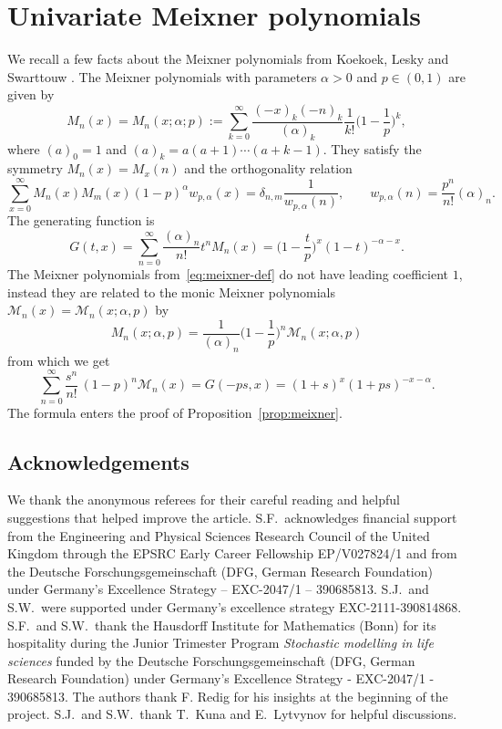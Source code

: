 \documentclass[pdftex]{sigma}
\numberwithin{equation}{section}
\newcommand{\1}{\mathbbm{1}}
\begin{document}
\section{Univariate Meixner polynomials} \label{app:meixner}
We recall a few facts about the Meixner polynomials from Koekoek, Lesky and Swarttouw \mbox{\cite[Section 9]{HypergeometricOrthogonalPolynomials}}. The Meixner polynomials with parameters $\alpha>0$ and $p\in (0,1)$ are given by
\begin{equation} \label{eq:meixner-def}
 M_n(x) = M_n(x; \alpha; p) := \sum_{k=0}^\infty \frac{(-x)_k (-n)_k}{(\alpha)_k} \frac{1}{k!} \biggl(1- \frac1p\biggr)^k,
\end{equation}
where $(a)_0 = 1$ and $(a)_k = a(a+1)\cdots (a+k-1)$.
They satisfy the symmetry $M_n(x) = M_x(n)$ and the orthogonality relation
\[
	\sum_{x=0}^\infty M_n(x) M_m(x) (1-p)^\alpha w_{p,\alpha}(x) = \delta_{n,m} \frac{1}{w_{p,\alpha}(n)},\qquad w_{p,\alpha}(n) = \frac{p^n}{n!} (\alpha)_n.
\] 	
The generating function is
\[
	G(t,x) = \sum_{n=0}^\infty \frac{(\alpha)_n}{n!} t^n M_n(x) = \biggl( 1- \frac t p \biggr)^x (1-t)^{-\alpha - x}.
\]
The Meixner polynomials from~\eqref{eq:meixner-def} do not have leading coefficient $1$, instead they are related to the monic Meixner polynomials $\mathcal M_n(x) = \mathcal M_n(x; \alpha, p)$ by
\begin{equation*} %
	M_n(x; \alpha, p) = \frac{1}{(\alpha)_n} \biggl( 1- \frac 1p\biggr)^n \mathcal M_n(x; \alpha, p)
\end{equation*}
from which we get
\begin{equation} \label{eq:pmonic-gf}
	\sum_{n=0}^\infty \frac{s^n}{n!}\,(1-p)^n \mathcal M_n(x) = G(-ps, x) = (1+s)^x (1+p s)^{-x-\alpha}.
\end{equation}
The formula enters the proof of Proposition~\ref{prop:meixner}.

\subsection*{Acknowledgements}

We thank the anonymous referees for their careful reading and helpful suggestions that helped improve the article.
S.F.\ acknowledges financial support from the Engineering and Physical Sciences Research Council of the United Kingdom through the EPSRC Early Career Fellowship EP/V027824/1 and from the Deutsche Forschungsgemeinschaft (DFG, German Research Foundation) under Germany’s Excellence Strategy – EXC-2047/1 – 390685813. S.J.\ and S.W.\ were supported under Germany's excellence strategy EXC-2111-390814868. S.F.\ and S.W.\ thank the Hausdorff Institute for Mathematics (Bonn) for its hospitality during the Junior Trimester Program \textit{Stochastic modelling in life sciences} funded by the Deutsche Forschungsgemeinschaft (DFG, German Research Foundation) under Germany’s Excellence Strategy - EXC-2047/1 - 390685813. The authors thank F. Redig for his insights at the beginning of the project. S.J.\ and S.W.\ thank T.~Kuna and E.~Lytvynov for helpful discussions.
\end{document}
